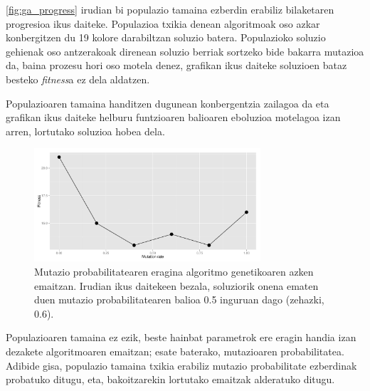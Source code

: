 \documentclass[eu]{ifirak}\usepackage[]{graphicx}\usepackage[]{color}
\newcommand{\eng}[1]{\textit{#1}}
\begin{document}
\ref{fig:ga_progress} irudian bi populazio tamaina ezberdin erabiliz bilaketaren progresioa ikus daiteke. Populazioa txikia denean algoritmoak oso azkar konbergitzen du 19 kolore darabiltzan soluzio batera. Populazioko soluzio gehienak oso antzerakoak direnean soluzio berriak sortzeko bide bakarra mutazioa da, baina prozesu hori oso motela denez, grafikan ikus daiteke soluzioen bataz besteko \eng{fitness}a ez dela aldatzen. 

Populazioaren tamaina handitzen dugunean konbergentzia zailagoa da eta grafikan ikus daiteke helburu funtzioaren balioaren eboluzioa motelagoa izan arren, lortutako soluzioa hobea dela.

\begin{figure}[t]
\centering
\includegraphics[width=0.75\textwidth] {./Irudiak/ga_mut_rate-1}
\caption{Mutazio probabilitatearen eragina algoritmo genetikoaren azken emaitzan. Irudian ikus daitekeen bezala, soluziorik onena ematen duen mutazio probabilitatearen balioa 0.5 inguruan dago (zehazki, 0.6). }\label{fig:ga_mutrate}
\end{figure}

Populazioaren tamaina ez ezik, beste hainbat parametrok ere eragin handia izan dezakete algoritmoaren emaitzan; esate baterako, mutazioaren probabilitatea. Adibide gisa, populazio tamaina txikia erabiliz mutazio probabilitate ezberdinak probatuko ditugu, eta, bakoitzarekin lortutako emaitzak alderatuko ditugu.
\end{document}

